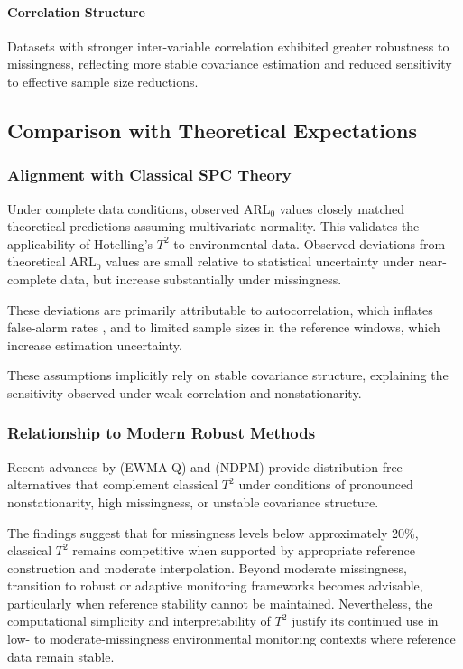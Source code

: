 \paragraph{Correlation Structure}
Datasets with stronger inter-variable correlation exhibited greater robustness to missingness, reflecting more stable covariance estimation and reduced sensitivity to effective sample size reductions.


\subsection{Comparison with Theoretical Expectations}

\subsubsection{Alignment with Classical SPC Theory}

Under complete data conditions, observed \ac{ARL}$_0$ values closely matched theoretical predictions assuming multivariate normality. This validates the applicability of Hotelling's $T^2$ to environmental data. Observed deviations from theoretical \ac{ARL}$_0$ values are small relative to statistical uncertainty under near-complete data, but increase substantially under missingness.

These deviations are primarily attributable to autocorrelation, which inflates false-alarm rates \cite{Venkatasubramanian2003}, and to limited sample sizes in the reference windows, which increase estimation uncertainty.

These assumptions implicitly rely on stable covariance structure, explaining the sensitivity observed under weak correlation and nonstationarity.


\subsubsection{Relationship to Modern Robust Methods}

Recent advances by \cite{Xie2024} (EWMA-Q) and \cite{Xie2023} (\ac{NDPM}) provide distribution-free alternatives that complement classical $T^2$ under conditions of pronounced nonstationarity, high missingness, or unstable covariance structure.


The findings suggest that for missingness levels below approximately 20\%, classical $T^2$ remains competitive when supported by appropriate reference construction and moderate interpolation. Beyond moderate missingness, transition to robust or adaptive monitoring frameworks becomes advisable, particularly when reference stability cannot be maintained. Nevertheless, the computational simplicity and interpretability of $T^2$ justify its continued use in low- to moderate-missingness environmental monitoring contexts where reference data remain stable.


